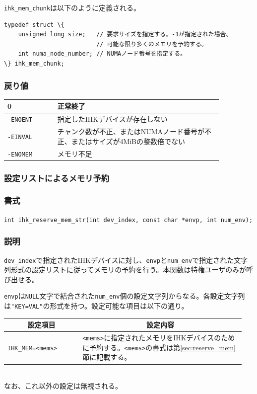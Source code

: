 \documentclass[twoside,11pt,fleqn]{book}
\begin{document}
\texttt{ihk\_mem\_chunk}は以下のように定義される。
\small
\begin{Verbatim}[commandchars=\\\{\}]
typedef struct \{
    unsigned long size;   // 要求サイズを指定する。-1が指定された場合、
                          // 可能な限り多くのメモリを予約する。
    int numa_node_number; // NUMAノード番号を指定する。
\} ihk_mem_chunk;
\end{Verbatim}
\normalsize

\subsubsection*{戻り値}{\quad}
\begin{table}[!h]
\footnotesize
\begin{tabular}{|p{0.20\linewidth}|p{0.66\linewidth}|} \hline
0&正常終了\\ \hline
\texttt{-ENOENT}&指定したIHKデバイスが存在しない\\ \hline
\texttt{-EINVAL}&チャンク数が不正、またはNUMAノード番号が不正、またはサイズが4MiBの整数倍でない\\ \hline
\texttt{-ENOMEM}&メモリ不足\\ \hline
\end{tabular}
\vspace{-0em}
\end{table}
\FloatBarrier

\subsubsection{設定リストによるメモリ予約}
\subsubsection*{書式}{\quad} \verb:int ihk_reserve_mem_str(int dev_index, const char *envp, int num_env);:
\subsubsection*{説明}{\quad} \verb:dev_index:で指定されたIHKデバイスに対し、\verb:envp:と\verb:num_env:で指定された文字列形式の設定リストに従ってメモリの予約を行う。本関数は特権ユーザのみが呼び出せる。

\verb:envp:は\verb:NULL:文字で結合された\verb:num_env:個の設定文字列からなる。各設定文字列は\verb:"KEY=VAL":の形式を持つ。設定可能な項目は以下の通り。
\begin{table}[!h]
\footnotesize
\begin{tabular}{|p{0.30\linewidth}|p{0.65\linewidth}|} \hline
\multicolumn{1}{|c}{\textbf{設定項目}}&\multicolumn{1}{|c|}{\textbf{設定内容}}\\ \hline \hline
\verb:IHK_MEM=<mems>:&\verb:<mems>:に指定されたメモリをIHKデバイスのために予約する。\verb:<mems>:の書式は第\ref{sec:reserve_mem}節に記載する。\\ \hline
\end{tabular}
\vspace{-0em}
\end{table}
\\なお、これ以外の設定は無視される。
\FloatBarrier
\end{document}
